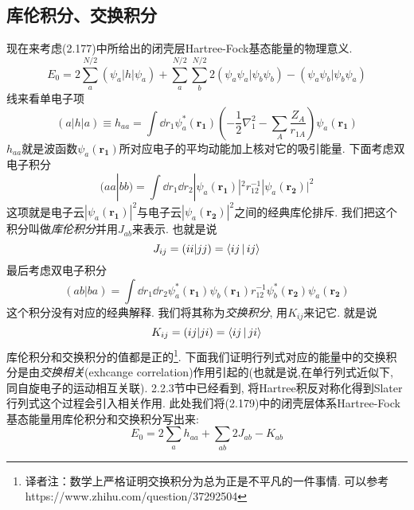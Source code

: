 \subsection{库伦积分、交换积分}
\label{sec2.3.6}
现在来考虑(2.177)中所给出的闭壳层Hartree-Fock基态能量的物理意义.
\begin{equation}
E_0 = 2 \sum_{a}^{N/2}(\psi_a|h|\psi_a) + \sum_{a}^{N/2}\sum_{b}^{N/2}2(\psi_a\psi_a|\psi_b\psi_b) - (\psi_a\psi_b|\psi_b\psi_a)
\end{equation}
线来看单电子项
\begin{equation}
(a|h|a) \equiv h_{aa} = \int\dd{r_1}\psi_a^*(\mathbf{r_1})\left( -\frac{1}{2}\nabla_1^2 - \sum_A\frac{Z_A}{r_{1A}} \right)\psi_a(\mathbf{r_1})
\end{equation}
$h_{aa}$就是波函数$\psi_a(\mathbf{r_1})$所对应电子的平均动能加上核对它的吸引能量. 下面考虑双电子积分
\begin{equation}
(aa|bb) = \int\dd{r_1}\dd{r_2}|\psi_a(\mathbf{r_1})|^2r_{12}^{-1}|\psi_a(\mathbf{r_2})|^2
\end{equation}
这项就是电子云$|\psi_a(\mathbf{r_1})|^2$与电子云$|\psi_a(\mathbf{r_2})|^2$之间的经典库伦排斥. 我们把这个积分叫做\emph{库伦积分}并用$J_{ab}$来表示. 也就是说
\begin{equation}
J_{ij} = (ii|jj) = \Braket{ij|ij}
\end{equation} 
最后考虑双电子积分
\begin{equation}
(ab|ba) = \int\dd{r_1}\dd{r_2} \psi_a^*(\mathbf{r_1})\psi_b(\mathbf{r_1}) r_{12}^{-1} \psi_b^*(\mathbf{r_2}) \psi_a(\mathbf{r_2})
\end{equation}
这个积分没有对应的经典解释. 我们将其称为\emph{交换积分}, 用$K_{ij}$来记它. 就是说
\begin{equation}
K_{ij} = (ij|ji) = \Braket{ij|ji}
\end{equation}
库伦积分和交换积分的值都是正的\footnote{
译者注：数学上严格证明交换积分为总为正是不平凡的一件事情. 可以参考 https://www.zhihu.com/question/37292504
}. 下面我们证明行列式对应的能量中的交换积分是由\emph{交换相关}(exhcange correlation)作用引起的(也就是说,在单行列式近似下, 同自旋电子的运动相互关联). 2.2.3节中已经看到, 将Hartree积反对称化得到Slater行列式这个过程会引入相关作用. 此处我们将(2.179)中的闭壳层体系Hartree-Fock基态能量用库伦积分和交换积分写出来:
\begin{equation}
E_0 = 2\sum_a h_{aa} + \sum_{ab}2J_{ab} - K_{ab} 
\end{equation}

